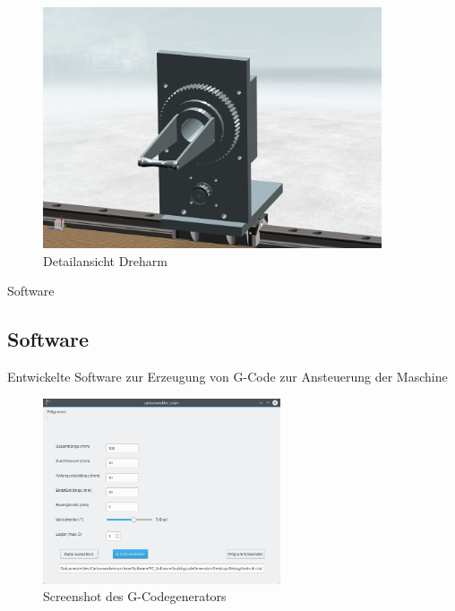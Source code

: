 \documentclass[12pt]{beamer}
\begin{document}
\begin{frame}
\begin{figure}
	\includegraphics[width=10cm]{NX_Screenshots/arm_vorne.png}
	\caption{Detailansicht Dreharm}
\end{figure}
\end{frame}


\begin{frame}{Software}
\subsection{Software}
Entwickelte Software zur Erzeugung von G-Code zur Ansteuerung der Maschine

\begin{figure}
	\includegraphics[width=7cm]{bilder/carbowickler_software.png}
	\caption{Screenshot des G-Codegenerators}
\end{figure}
\end{frame}
\end{document}
